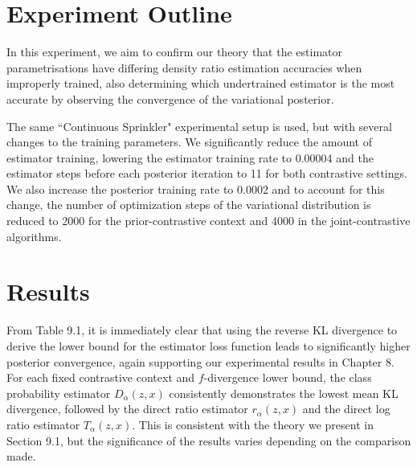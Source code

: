 \documentclass[honours,12pt]{unswthesis}
\numberwithin{equation}{section}
\theoremstyle{definition}
\begin{document}
\section{Experiment Outline}
In this experiment, we aim to confirm our theory that the estimator parametrisations have differing density ratio estimation accuracies when improperly trained, also determining which undertrained estimator is the most accurate by observing the convergence of the variational posterior.

The same ``Continuous Sprinkler" experimental setup is used, but with several changes to the training parameters. We significantly reduce the amount of estimator training, lowering the estimator training rate to 0.00004 and the estimator steps before each posterior iteration to 11 for both contrastive settings. We also increase the posterior training rate to 0.0002 and to account for this change, the number of optimization steps of the variational distribution is reduced to 2000 for the prior-contrastive context and 4000 in the joint-contrastive algorithms. 
\section{Results}
From Table 9.1, it is immediately clear that using the reverse KL divergence to derive the lower bound for the estimator loss function leads to significantly higher posterior convergence, again supporting our experimental results in Chapter 8. For each fixed contrastive context and $f$-divergence lower bound, the class probability estimator $D_\alpha(z,x)$ consistently demonstrates the lowest mean KL divergence, followed by the direct ratio estimator $r_\alpha (z,x)$ and the direct log ratio estimator $T_\alpha(z,x)$. This is consistent with the theory we present in Section 9.1, but the significance of the results varies depending on the comparison made.
\end{document}
